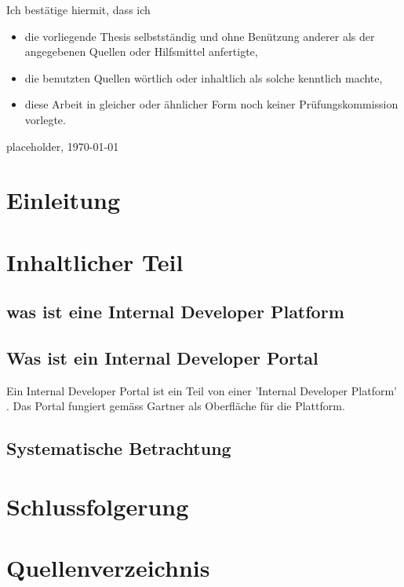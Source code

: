 \documentclass[a4paper,12pt]{article}
\begin{document}
    Ich bestätige hiermit, dass ich
    \begin{itemize}
        \item die vorliegende Thesis selbstständig und ohne Benützung anderer als der angegebenen Quellen oder Hilfsmittel anfertigte,
        \item die benutzten Quellen wörtlich oder inhaltlich als solche kenntlich machte,
        \item diese Arbeit in gleicher oder ähnlicher Form noch keiner Prüfungskommission vorlegte.
    \end{itemize}
    placeholder, \today\newline

    \section{Einleitung}
    \section{Inhaltlicher Teil}
    \subsection{was ist eine Internal Developer Platform}

    \subsection{Was ist ein Internal Developer Portal}
    Ein Internal Developer Portal ist ein Teil von einer 'Internal Developer Platform' \cite{idporgdevportal}. Das
    Portal fungiert gemäss Gartner\cite{gartner} als Oberfläche für die Plattform.



    \subsection{Systematische Betrachtung}

    \section{Schlussfolgerung}
    \section{Quellenverzeichnis}

    \printbibliography[heading=none]
\end{document}
